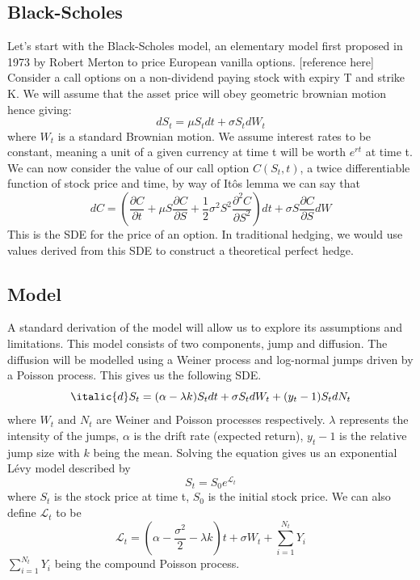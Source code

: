\documentclass[12pt]{article}
\numberwithin{equation}{section}
\begin{document}
\subsection{Black-Scholes}
Let's start with the Black-Scholes model, an elementary model first proposed in 
1973 by Robert Merton to price European vanilla options. [reference here] \\
Consider a call options on a non-dividend paying stock with expiry T and strike K. 
We will assume that the asset price will obey geometric brownian motion hence 
giving: 
\begin{equation}
dS_t = \mu {S_t} dt + \sigma S_t dW_t
\end{equation}
where $W_t$ is a standard Brownian motion. We assume interest rates to be constant,
meaning a unit of a given currency at time t will be worth $e^{rt}$ at time t.\\
We can now consider the value of our call option $C(S_t,t)$, a twice differentiable 
function of stock price and time, by way of It\^{o}s 
lemma
we can say that 
\begin{equation}
dC = \left( \frac{\partial C}{\partial t} + \mu S \frac{\partial C}{\partial S} + \frac{1}{2} \sigma^2 S^2 \frac{\partial^2 C}{\partial S^2} \right) dt + \sigma S \frac{\partial C}{\partial S} dW
\end{equation}
This is the SDE for the price of an option. In traditional hedging, we would use 
values derived from this SDE to construct a theoretical perfect hedge. 
\subsection{Model}
A standard derivation of the model will allow us to explore its assumptions and 
limitations. This model consists of two components, jump and diffusion. The 
diffusion will be modelled using a Weiner process and log-normal jumps driven 
by a Poisson process. This gives us the following
SDE. 
\begin{equation}
  \italic{d}S_t = (\alpha - \lambda k)S_tdt + \sigma S_t dW_t + (y_t-1)S_tdN_t
\end{equation}
where $W_t \text{ and } N_t$ are Weiner and Poisson processes respectively. 
$\lambda$ represents the intensity of the jumps, $\alpha$ is the drift rate
(expected return), $y_t - 1$ is the relative jump size with $k$ being the mean. 
Solving the equation gives us an exponential L\'{e}vy model described by 
\begin{equation}
  S_t = S_0e^{\mathcal{L}_t}
\end{equation}
where $S_t$ is the stock price at time t, $S_0$ is the initial stock price. 
We can also define $\mathcal{L}_t$ to be 
\begin{equation}
  \mathcal{L}_t = (\alpha - \frac{\sigma^2}{2}-\lambda k)t + \sigma W_t + 
  \sum^{N_t}_{i=1}Y_i
\end{equation}
$\sum_{i=1}^{N_t}Y_i$ being the compound Poisson process. 
\end{document}
